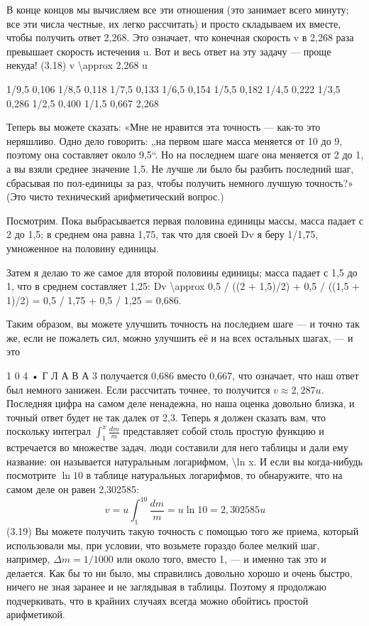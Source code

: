 \documentclass[10pt,oneside]{article}
\begin{document}
В конце концов мы вычисляем все эти отношения (это занимает всего минуту; все эти числа честные, их легко рассчитать) и просто складываем их вместе, чтобы получить ответ 2,268. Это означает, что конечная скорость v в 2,268 раза превышает скорость истечения u. Вот и весь ответ на эту задачу --- проще некуда! (3.18) v \textbackslash{}approx 2,268 u\par

1/9,5   0,106 1/8,5   0,118 1/7,5   0,133 1/6,5   0,154 1/5,5   0,182 1/4,5   0,222 1/3,5   0,286 1/2,5   0,400 1/1,5   0,667 2,268\par

Теперь вы можете сказать: «Мне не нравится эта точность --- как-то это неряшливо. Одно дело говорить: „на первом шаге масса меняется от 10 до 9, поэтому она составляет около 9,5“. Но на последнем шаге она меняется от 2 до 1, а вы взяли среднее значение 1,5. Не лучше ли было бы разбить последний шаг, сбрасывая по пол-единицы за раз, чтобы получить немного лучшую точность?» (Это чисто технический арифметический вопрос.)\par

Посмотрим. Пока выбрасывается первая половина единицы массы, масса падает с 2 до 1,5; в среднем она равна 1,75, так что для своей Dv я беру 1/1,75, умноженное на половину единицы.\par

Затем я делаю то же самое для второй половины единицы; масса падает с 1,5 до 1, что в среднем составляет 1,25: Dv \textbackslash{}approx 0,5 / ((2 + 1,5)/2) + 0,5 / ((1,5 + 1)/2) = 0,5 / 1,75 + 0,5 / 1,25 = 0,686.\par

Таким образом, вы можете улучшить точность на последнем шаге --- и точно так же, если не пожалеть сил, можно улучшить её и на всех остальных шагах, --- и это\par

1 0 4 • Г Л А В А  3 получается 0,686 вместо 0,667, что означает, что наш ответ был немного занижен. Если рассчитать точнее, то получится \(v \approx 2,287 u\). Последняя цифра на самом деле ненадежна, но наша оценка довольно близка, и точный ответ будет не так далек от 2,3. Теперь я должен сказать вам, что поскольку интеграл \(\int_1^x \frac{dm}{m}\) представляет собой столь простую функцию и встречается во множестве задач, люди составили для него таблицы и дали ему название: он называется натуральным логарифмом, \textbackslash{}ln x. И если вы когда-нибудь посмотрите \(\ln 10\) в таблице натуральных логарифмов, то обнаружите, что на самом деле он равен 2,302585: \[v = u \int_1^{10} \frac{dm}{m} = u \ln 10 = 2,302585 u\] (3.19) Вы можете получить такую точность с помощью того же приема, который использовали мы, при условии, что возьмете гораздо более мелкий шаг, например, \(\Delta m = 1/1000\) или около того, вместо 1, --- и именно так это и делается. Как бы то ни было, мы справились довольно хорошо и очень быстро, ничего не зная заранее и не заглядывая в таблицы. Поэтому я продолжаю подчеркивать, что в крайних случаях всегда можно обойтись простой арифметикой.\par
\end{document}
